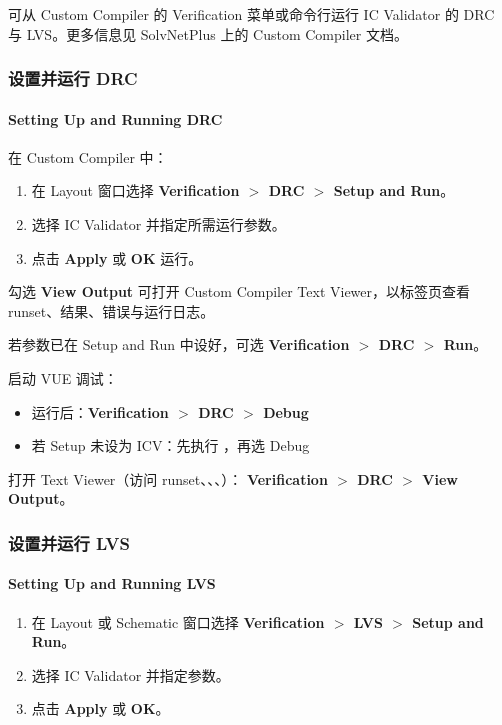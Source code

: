 可从 Custom Compiler 的 Verification 菜单或命令行运行 IC Validator 的 DRC 与 LVS。更多信息见 SolvNetPlus 上的 Custom Compiler 文档。

\subsubsection{设置并运行 DRC}
\paragraph*{Setting Up and Running DRC}

在 Custom Compiler 中：
\begin{enumerate}
  \item 在 Layout 窗口选择 \textbf{Verification $>$ DRC $>$ Setup and Run}。
  \item 选择 IC Validator 并指定所需运行参数。
  \item 点击 \textbf{Apply} 或 \textbf{OK} 运行。
\end{enumerate}

\begin{noteBox}
勾选 \textbf{View Output} 可打开 Custom Compiler Text Viewer，以标签页查看 runset、结果、错误与运行日志。
\end{noteBox}

若参数已在 Setup and Run 中设好，可选 \textbf{Verification $>$ DRC $>$ Run}。

启动 VUE 调试：
\begin{itemize}
  \item 运行后：\textbf{Verification $>$ DRC $>$ Debug}
  \item 若 Setup 未设为 ICV：先执行 ，再选 Debug
\end{itemize}

打开 Text Viewer（访问 runset、、、）：
\textbf{Verification $>$ DRC $>$ View Output}。

\subsubsection{设置并运行 LVS}
\paragraph*{Setting Up and Running LVS}

\begin{enumerate}
  \item 在 Layout 或 Schematic 窗口选择 \textbf{Verification $>$ LVS $>$ Setup and Run}。
  \item 选择 IC Validator 并指定参数。
  \item 点击 \textbf{Apply} 或 \textbf{OK}。
\end{enumerate}

